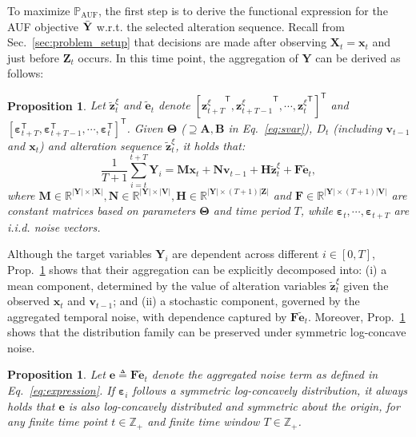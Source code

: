 \documentclass{article}
\theoremstyle{plain}
\newtheorem{proposition}[theorem]{Proposition}
\theoremstyle{definition}
\theoremstyle{remark}
\def \Eq {Eq.}
\def \Sec {Sec.}
\def \prop {Prop.}
\def \x {\mathbf{x}}
\def \Z {\mathbf{Z}}
\def \V {\mathbf{V}}
\def \N {\mathbf{N}}
\def \X {\mathbf{X}}
\def \Y {\mathbf{Y}}
\def \M {\mathbf{M}}
\def \H {\mathbf{H}}
\def \A {\mathbf{A}}
\def \V {\mathbf{V}}
\def \B {\mathbf{B}}
\def \F {\mathbf{F}}
\def \e {\mathbf{e}}
\def \v {\mathbf{v}}
\def \z {\mathbf{z}}
\begin{document}
To maximize \(\mathbb{P}_{\operatorname{AUF}}\), the first step is to derive the functional expression for the AUF objective \(\Bar{\Y}\) w.r.t. the selected alteration sequence. 
Recall from \Sec~\ref{sec:problem_setup} that decisions are made after observing \(\X_t=\x_t\) and just before \(\Z_t\) occurs. 
In this time point, the aggregation of \(\Y\) can be derived as follows:
\begin{proposition}
  \label{prop:expression}
  Let \(\tilde{\z}_t^\xi\) and \(\tilde{\e}_t\) denote \(\left[{\z^\xi_{t+T}}^\mathsf{T}, {\z^\xi_{t+T-1}}^\mathsf{T}, \cdots, {\z^\xi_{t}}^\mathsf{T}\right]^\mathsf{T}\) and \(\left[\bm{\varepsilon}_{t+T}^\mathsf{T}, \bm{\varepsilon}_{t+T-1}^\mathsf{T}, \cdots, \bm{\varepsilon}_{t}^\mathsf{T}\right]^\mathsf{T}\). Given \(\bm{\Theta}\) (\(\supseteq \A,\B\) in \Eq~\eqref{eq:svar}), \(D_t\) (including \(\v_{t-1}\) and \(\x_t\)) and alteration sequence \(\tilde{\z}_t^\xi\), it holds that:
  \vskip -0.16in
  \begin{equation}
    \label{eq:expression}
    \frac{1}{T+1}\sum_{i=t}^{t+T} \Y_{i} = \M\x_t + \N\v_{t-1} + \H\tilde{\z}_t^\xi + \F\tilde{\e}_t, 
  \end{equation}
  \vskip -0.06in
  where \(\M\in\mathbb{R}^{|\Y|\times |\X|}, \N\in\mathbb{R}^{|\Y|\times |\V|}, \H\in\mathbb{R}^{|\Y|\times (T+1)|\Z|}\) and \(\F\in\mathbb{R}^{|\Y|\times (T+1)|\V|}\) are constant matrices based on parameters \(\bm{\Theta}\) and time period \(T\), while \(\bm{\varepsilon}_{t},\cdots, \bm{\varepsilon}_{t+T}\) are i.i.d. noise vectors.
\end{proposition}

Although the target variables \(\Y_{i}\) are dependent across different \(i \in [0, T]\), \prop~\ref{prop:expression} shows that their aggregation can be explicitly decomposed into:  
(i) a mean component, determined by the value of alteration variables \(\tilde{\z}_t^\xi\) given the observed \(\x_t\) and \(\v_{t-1}\); and 
(ii) a stochastic component, governed by the aggregated temporal noise, with dependence captured by \(\F\tilde{\e}_t\).  
Moreover, \prop~\ref{prop:agg_noise} shows that the distribution family can be preserved under symmetric log-concave noise. 




\begin{proposition}
  \label{prop:agg_noise}
  Let \(\e \triangleq \F\tilde{\e}_t\) denote the aggregated noise term as defined in \Eq~\eqref{eq:expression}. 
  If \(\bm{\varepsilon}_{i}\) follows a symmetric log-concavely distribution, it always holds that \(\e\) is also log-concavely distributed and symmetric about the origin, for any finite time point \(t\in \mathbb{Z}_+\) and finite time window \(T\in \mathbb{Z}_+\). 
\end{proposition}
\end{document}
